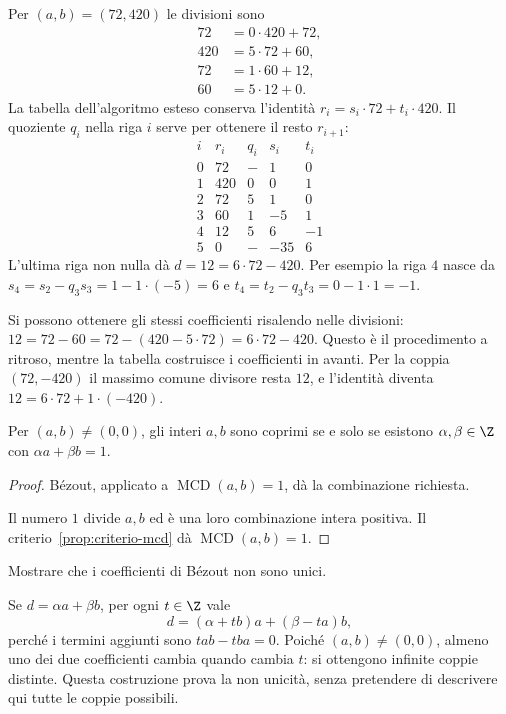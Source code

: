 \begin{esempio}
Per $(a,b)=(72,420)$ le divisioni sono
\[
\begin{aligned}
72&=0\cdot420+72,\\
420&=5\cdot72+60,\\
72&=1\cdot60+12,\\
60&=5\cdot12+0.
\end{aligned}
\]
La tabella dell'algoritmo esteso conserva l'identità $r_i=s_i\cdot72+t_i\cdot420$. Il quoziente $q_i$ nella riga $i$ serve per ottenere il resto $r_{i+1}$:
\[
\begin{array}{c|r|r|r|r}
i&r_i&q_i&s_i&t_i\\\hline
0&72&-&1&0\\
1&420&0&0&1\\
2&72&5&1&0\\
3&60&1&-5&1\\
4&12&5&6&-1\\
5&0&-&-35&6
\end{array}
\]
L'ultima riga non nulla dà $d=12=6\cdot72-420$. Per esempio la riga $4$ nasce da $s_4=s_2-q_3s_3=1-1\cdot(-5)=6$ e $t_4=t_2-q_3t_3=0-1\cdot1=-1$.

Si possono ottenere gli stessi coefficienti risalendo nelle divisioni: $12=72-60=72-(420-5\cdot72)=6\cdot72-420$. Questo è il procedimento a ritroso, mentre la tabella costruisce i coefficienti in avanti. Per la coppia $(72,-420)$ il massimo comune divisore resta $12$, e l'identità diventa $12=6\cdot72+1\cdot(-420)$.
\end{esempio}

\begin{corollario}
Per $(a,b)\ne(0,0)$, gli interi $a,b$ sono coprimi se e solo se esistono $\alpha,\beta\in\Z$ con $\alpha a+\beta b=1$.
\end{corollario}
\begin{proof}
\passomath{\Rightarrow} Bézout, applicato a $\operatorname{MCD}(a,b)=1$, dà la combinazione richiesta.

\passomath{\Leftarrow} Il numero $1$ divide $a,b$ ed è una loro combinazione intera positiva. Il criterio~\ref{prop:criterio-mcd} dà $\operatorname{MCD}(a,b)=1$.
\end{proof}

\begin{esercizio}
Mostrare che i coefficienti di Bézout non sono unici.
\end{esercizio}
\begin{svolgimento}
Se $d=\alpha a+\beta b$, per ogni $t\in\Z$ vale
\[
d=(\alpha+tb)a+(\beta-ta)b,
\]
perché i termini aggiunti sono $tab-tba=0$. Poiché $(a,b)\ne(0,0)$, almeno uno dei due coefficienti cambia quando cambia $t$: si ottengono infinite coppie distinte. Questa costruzione prova la non unicità, senza pretendere di descrivere qui tutte le coppie possibili.
\end{svolgimento}

